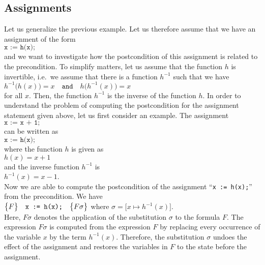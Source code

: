 \subsection{Assignments}
Let us generalize the previous example.  Let us therefore assume that we have an assignment of the
form 
\\[0.2cm]
\hspace*{1.3cm}
$ \texttt{x := h(x);} $
\\[0.2cm]
and we want to investigate how the postcondition  of this assignment is related to the
precondition.  To simplify matters, let us assume that the function
$h$ is invertible, i.e.~we assume that there is a function $h^{-1}$ such that we have
\\[0.2cm]
\hspace*{1.3cm}
$ h^{-1}\bigl(h(x)\bigr) = x \quad \mathtt{and} \quad h\bigl(h^{-1}(x)\bigr) = x $
\\[0.2cm]
for all $x$.  Then, the function $h^{-1}$ is the inverse of the function $h$.
In order to understand the problem of computing the postcondition for the assignment statement given
above, let us first consider an example.  The assignment
\\[0.2cm]
\hspace*{1.3cm}
$ \texttt{x := x + 1;} $
\\[0.2cm]
can be written as
\\[0.2cm]
\hspace*{1.3cm}
$ \texttt{x := h(x);} $
\\[0.2cm]
where the function $h$ is given as
\\[0.2cm]
\hspace*{1.3cm}
$ h(x) = x + 1 $
\\[0.2cm]
and the inverse function $h^{-1}$ is 
\\[0.2cm]
\hspace*{1.3cm}
$h^{-1}(x) = x - 1$. 
\\[0.2cm]
Now we are able to compute the postcondition of the assignment ``\texttt{x := h(x);}'' from the
precondition.  We have
\\[0.2cm]
\hspace*{1.3cm}
$\bigl\{F\bigr\}\quad\texttt{x := h(x);}\quad\bigl\{F\sigma\bigr\}$ \quad where \quad 
$\sigma = \bigl[x \mapsto h^{-1}(x)\bigr]$.
\\[0.2cm]
Here, $F\sigma$ denotes the application of the substitution $\sigma$ to the formula $F$.  The
expression  $F\sigma$ is computed from the expression $F$ by replacing every occurrence of the variable
$x$ by the term $h^{-1}(x)$.  Therefore, the substitution $\sigma$ undoes the effect of the
assignment and restores the variables in $F$ to the state before the assignment.

